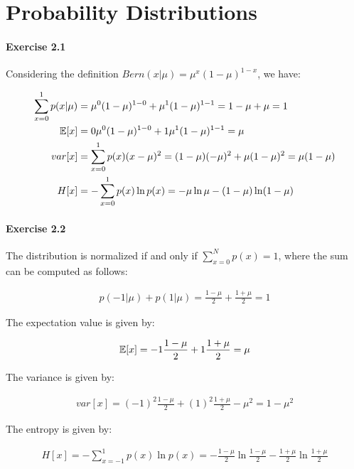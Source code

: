 \section{Probability Distributions}

\paragraph{Exercise 2.1}

Considering the definition $Bern(x|\mu) = \mu^x(1-\mu)^{1-x}$, we have:

\begin{align*}
    \sum_{x=0}^{1}p(x|\mu) &= \mu^0(1-\mu)^{1-0} + \mu^1(1-\mu)^{1-1} = 1 - \mu + \mu = 1 \\
    \operatorname*{\mathbb{E}}[x] &= 0\mu^0(1-\mu)^{1-0} + 1\mu^1(1-\mu)^{1-1} = \mu \\
    var[x] &= \sum_{x=0}^{1} p(x) (x - \mu) ^2 = (1-\mu)(-\mu)^2 + \mu(1 - \mu)^2 = \mu (1 - \mu)\\
    H[x] &= -\sum_{x=0}^{1} p(x) \ln p(x) = -\mu \ln \mu - (1 - \mu) \ln (1 - \mu)
\end{align*}

\paragraph{Exercise 2.2}

The distribution is normalized if and only if $\sum_{x=0}^{N} p(x) = 1$, where the sum can be computed as follows:

\begin{align*}
    p(-1|\mu) + p(1|\mu) = \frac{1-\mu}{2} + \frac{1+\mu}{2} = 1
\end{align*}

The expectation value is given by:

\begin{align*}
    \operatorname*{\mathbb{E}}[x] = -1 \frac{1-\mu}{2} + 1 \frac{1+\mu}{2} = \mu
\end{align*}

The variance is given by:

\begin{align*}
    var[x] = (-1)^2 \frac{1-\mu}{2} + (1)^2 \frac{1+\mu}{2} - \mu^2 = 1 - \mu^2
\end{align*}

The entropy is given by:

\begin{align*}
    H[x] = -\sum_{x=-1}^{1} p(x) \ln p(x) = -\frac{1-\mu}{2} \ln \frac{1-\mu}{2} - \frac{1+\mu}{2} \ln \frac{1+\mu}{2}
\end{align*}

